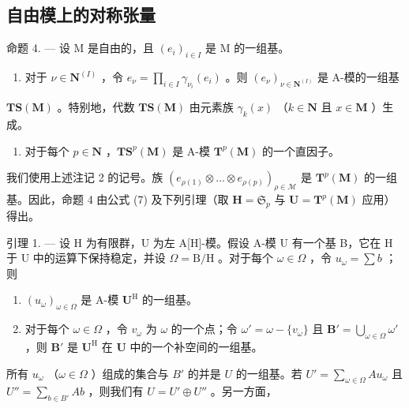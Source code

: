 \subsection{自由模上的对称张量}

命题 4. --- 设 M 是自由的，且 \((e_{i})_{i\in I}\) 是 M 的一组基。

\begin{enumerate}
\def\labelenumi{(\roman{enumi})}
\tightlist
\item
  对于 \(\nu \in \mathbf{N}^{(I)}\) ，令 \(e_{\nu} = \prod_{i\in I}\gamma_{\nu_i}(e_i)\) 。则 \((e_{\nu})_{\nu \in \mathbf{N}^{(I)}}\) 是 A-模的一组基
\end{enumerate}

\(\mathbf{TS}(\mathbf{M})\) 。特别地，代数 \(\mathbf{TS}(\mathbf{M})\) 由元素族 \(\gamma_k(x)\) （\(k \in \mathbf{N}\) 且 \(x \in \mathbf{M}\) ）生成。

\begin{enumerate}
\def\labelenumi{(\roman{enumi})}
\setcounter{enumi}{1}
\tightlist
\item
  对于每个 \(p \in \mathbf{N}\) ，\(\mathbf{T}\mathbf{S}^p(\mathbf{M})\) 是 A-模 \(\mathbf{T}^p(\mathbf{M})\) 的一个直因子。
\end{enumerate}

我们使用上述注记 2 的记号。族 \((e_{\rho(1)} \otimes \ldots \otimes e_{\rho(p)})_{\rho \in \mathcal{M}}\) 是 \(\mathbf{T}^p(\mathbf{M})\) 的一组基。因此，命题 4 由公式 (7) 及下列引理（取 \(\mathbf{H} = \mathfrak{S}_p\) 与 \(\mathbf{U} = \mathbf{T}^p(\mathbf{M})\) 应用）得出。

引理 1. --- 设 H 为有限群，U 为左 A{[}H{]}-模。假设 A-模 U 有一个基 B，它在 H 于 U 中的运算下保持稳定，并设 \(\Omega = \mathrm{B} / \mathrm{H}\) 。对于每个 \(\omega \in \Omega\) ，令 \(u_{\omega} = \sum b\) ；则

\begin{enumerate}
\def\labelenumi{(\roman{enumi})}
\item
  \((u_{\omega})_{\omega \in \Omega}\) 是 A-模 \(\mathbf{U}^{\mathrm{H}}\) 的一组基。
\item
  对于每个 \(\omega \in \Omega\) ，令 \(v_{\omega}\) 为 \(\omega\) 的一个点；令 \(\omega' = \omega - \{v_{\omega}\}\) 且 \(\mathbf{B}' = \bigcup_{\omega \in \Omega} \omega'\) ，则 \(\mathbf{B}'\) 是 \(\mathbf{U}^{\mathrm{H}}\) 在 \(\mathbf{U}\) 中的一个补空间的一组基。
\end{enumerate}

所有 \(u_{\omega}\) （\(\omega \in \Omega\) ）组成的集合与 \(B'\) 的并是 \(U\) 的一组基。若 \(U' = \sum_{\omega \in \Omega} Au_{\omega}\) 且 \(U'' = \sum_{b \in B'} Ab\) ，则我们有 \(U = U' \oplus U''\) 。另一方面，

